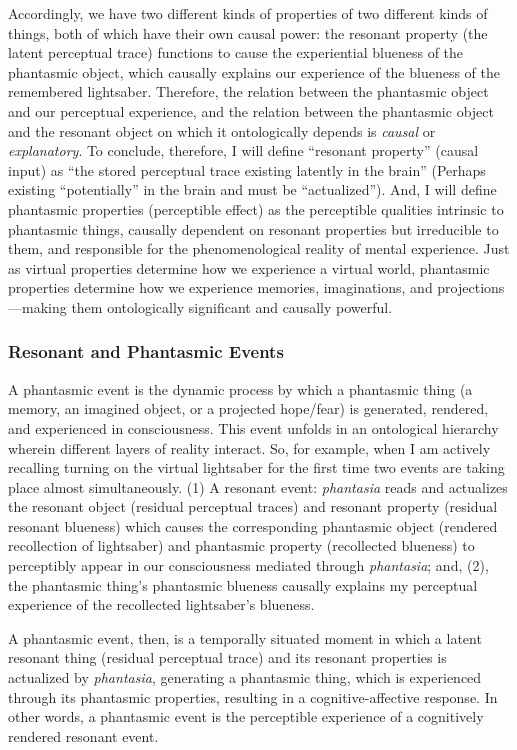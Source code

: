 \documentclass{article}
\begin{document}
Accordingly, we have two different kinds of properties of two different kinds of things, both of which have their own causal power: the resonant property (the latent perceptual trace) functions to cause the experiential blueness of the phantasmic object, which causally explains our experience of the blueness of the remembered lightsaber. Therefore, the relation between the phantasmic object and our perceptual experience, and the relation between the phantasmic object and the resonant object on which it ontologically depends is \textit{causal} or \textit{explanatory}. To conclude, therefore, I will define ``resonant property'' (causal input) as ``the stored perceptual trace existing latently in the brain'' (Perhaps existing ``potentially'' in the brain and must be ``actualized''). And, I will define phantasmic properties (perceptible effect) as the perceptible qualities intrinsic to phantasmic things, causally dependent on resonant properties but irreducible to them, and responsible for the phenomenological reality of mental experience. Just as virtual properties determine how we experience a virtual world, phantasmic properties determine how we experience memories, imaginations, and projections—making them ontologically significant and causally powerful.

\subsubsection*{Resonant and Phantasmic Events}

A phantasmic event is the dynamic process by which a phantasmic thing (a memory, an imagined object, or a projected hope/fear) is generated, rendered, and experienced in consciousness. This event unfolds in an ontological hierarchy wherein different layers of reality interact. So, for example, when I am actively recalling turning on the virtual lightsaber for the first time two events are taking place almost simultaneously. (1) A resonant event: \textit{phantasia} reads and actualizes the resonant object (residual perceptual traces) and resonant property (residual resonant blueness) which causes the corresponding phantasmic object (rendered recollection of lightsaber) and phantasmic property (recollected blueness) to perceptibly appear in our consciousness mediated through \textit{phantasia}; and, (2), the phantasmic thing's phantasmic blueness causally explains my perceptual experience of the recollected lightsaber's blueness.

A phantasmic event, then, is a temporally situated moment in which a latent resonant thing (residual perceptual trace) and its resonant properties is actualized by \textit{phantasia}, generating a phantasmic thing, which is experienced through its phantasmic properties, resulting in a cognitive-affective response. In other words, a phantasmic event is the perceptible experience of a cognitively rendered resonant event.
\end{document}
